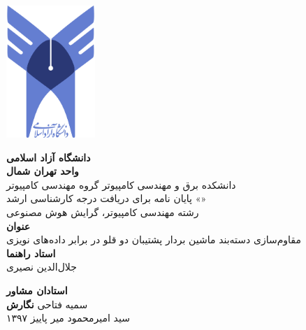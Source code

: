 \thispagestyle{empty}

\centerline{\includegraphics[height=5cm]{logo.png}}

\begin{center}
\vspace{0.5cm}

\textbf{دانشگاه آزاد اسلامی}
\\[.2cm]
\textbf{واحد تهران شمال}
\\[0.5cm]

دانشکده برق و مهندسی کامپیوتر گروه مهندسی کامپیوتر
\\[.5cm]
پایان نامه برای دریافت درجه کارشناسی ارشد «»
\\[.2cm]
رشته مهندسی کامپیوتر، گرایش هوش مصنوعی
\\[0.5cm]

{\Large
\textbf{عنوان}
}
\\
مقاوم‌سازی دسته‌بند ماشین بردار پشتیبان دو قلو در برابر داده‌های نویزی
\\[0.5cm]

{\Large
	\textbf{استاد راهنما}
}
\\
جلال‌ا‌لدین نصیری
\vskip 0.5cm

{\Large
	\textbf{استادان مشاور}
}
\\
سمیه فتاحی
\vskip 0.5cm
{\Large
	\textbf{نگارش}
}
\\
سید امیرمحمود میر
\vskip 0.5cm
پاییز ۱۳۹۷
\end{center}